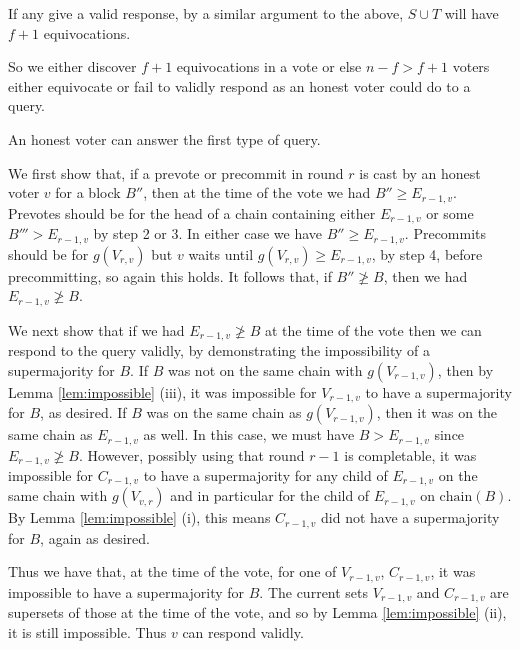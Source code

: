 \documentclass[a4paper,UKenglish,cleveref, autoref, thm-restate, anonymous]{lipics-v2019}
\begin{document}
If any give a valid response, by a similar argument to the above, $S \cup T$ will have $f+1$ equivocations.

So we either discover $f+1$ equivocations in a vote or else $n-f > f+1$ voters either equivocate or fail to validly respond as an honest voter could do to a query.


\begin{lemma} \label{lem:honest-answer}
An honest voter can answer the first type of query.
\end{lemma}
We first show that, if a prevote or precommit in round $r$ is cast by an honest voter $v$ for a block $B''$, then at the time of the vote we had $B'' \geq E_{r-1,v}$.
Prevotes should be for the head of a chain containing either $E_{r-1,v}$ or some $B''' > E_{r-1,v}$ by step 2 or 3.  In either case we have $B'' \geq E_{r-1,v}$. Precommits should be for $g(V_{r,v})$ but $v$ waits until $g(V_{r,v}) \geq E_{r-1,v}$, by step 4, before precommitting, so again this holds.
It follows that, if $B'' \not\geq B$, then we had $E_{r-1,v} \not\geq B$.

We next show that if we had $E_{r-1,v} \not\geq B$ at the time of the vote then we can respond to the query validly, by demonstrating the impossibility of a supermajority for $B$. 
If $B$ was not on the same chain with $g(V_{r-1,v})$, then by Lemma \ref{lem:impossible} (iii), it was impossible for $V_{r-1,v}$ to have a supermajority for $B$, as desired. 
If $B$ was on the same chain as $g(V_{r-1,v})$, then it was on the same chain as $E_{r-1,v}$ as well.  In this case, we must have $B > E_{r-1,v}$ since $E_{r-1,v} \not\geq B$.
 However, possibly using that round $r-1$ is completable, it was impossible for $C_{r-1,v}$ to have a supermajority for any child of $E_{r-1,v}$ on the same chain with $g(V_{v,r})$ and in particular for the child of $E_{r-1,v}$ on $\textrm{chain}(B)$.
By Lemma \ref{lem:impossible} (i), this means $C_{r-1,v}$ did not have a supermajority for $B$, again as desired.

Thus we have that, at the time of the vote, for one of $V_{r-1,v}$, $C_{r-1,v}$, it was impossible to have a supermajority for $B$. The current sets $V_{r-1,v}$ and $C_{r-1,v}$ are supersets of those at the time of the vote, and so by Lemma \ref{lem:impossible} (ii), it is still impossible. Thus $v$ can respond validly.
\end{document}
